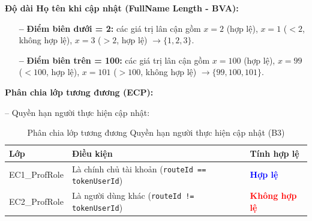 \documentclass[11pt,a4paper]{article}
\begin{document}
\noindent\textbf{Độ dài Họ tên khi cập nhật (FullName Length - BVA):}
\begin{figure}[H]
\centering
{}
\end{figure}
\begin{itemize}[leftmargin=1.2cm, noitemsep]
    \item[\textbf{--}] \textbf{Điểm biên dưới = 2:} các giá trị lân cận gồm $x = 2$ (hợp lệ), $x = 1$ ($< 2$, không hợp lệ), $x = 3$ ($> 2$, hợp lệ) $\rightarrow \{1, 2, 3\}$.
    \item[\textbf{--}] \textbf{Điểm biên trên = 100:} các giá trị lân cận gồm $x = 100$ (hợp lệ), $x = 99$ ($< 100$, hợp lệ), $x = 101$ ($> 100$, không hợp lệ) $\rightarrow \{99, 100, 101\}$.
\end{itemize}

\noindent\textbf{Phân chia lớp tương đương (ECP):}

\noindent -- Quyền hạn người thực hiện cập nhật:
\begin{table}[H]
\centering
\small
\begin{tabularx}{\textwidth}{|L{3.0cm}|X|C{3.2cm}|}
\hline
{}
\textbf{Lớp} & \textbf{Điều kiện} & \textbf{Tính hợp lệ} \tabularnewline
\hline
EC1\_ProfRole & Là chính chủ tài khoản (\texttt{routeId == tokenUserId}) & \textcolor{blue}{\textbf{Hợp lệ}} \\ \hline
EC2\_ProfRole & Là người dùng khác (\texttt{routeId != tokenUserId}) & \textcolor{red}{\textbf{Không hợp lệ}} \\ \hline
\end{tabularx}
\caption{Phân chia lớp tương đương Quyền hạn người thực hiện cập nhật (B3)}
\end{table}
\end{document}
